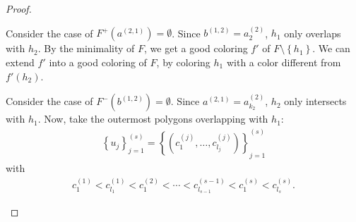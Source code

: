 \documentclass[12pt]{article}
\theoremstyle{definition}
\def\rxhalf{0.5/2}
\def\ryhalf{0.4/2}
\def\rxfourpoint{4.5/2}
\def\ryfourpoint{2.3/2}
\def\rxfivepoint{5.5/2}
\def\ryfivepoint{3.0/2}
\begin{document}
\begin{proof}
\begin{itemize}
\begin{figure}[ht]
\begin{center}
{
             }
             \end{center}
             \caption{}
             \label{figure:t=2}
             \end{figure}
             
             Consider the case of
             $F^{+}\left(a^{\left(2, 1\right)}\right) = \emptyset$.
             Since $b^{\left(1, 2\right)} =
             a_{2}^{\left(2\right)}$, $h_1$ only
             overlaps with $h_2$.
             By the minimality of $F$, 
             we get a good coloring 
             $f'$ of $F \setminus \left\{h_1\right\}$.
             We can extend $f'$ into 
             a good coloring of $F$,
             by coloring $h_1$ with 
             a color different from
             $f'\left(h_2\right)$.

             Consider the case of
             $F^{-}\left(b^{\left(1, 2\right)}\right) = \emptyset$.
             Since $a^{\left(2, 1\right)} = 
             a_{k_2}^{\left(2\right)}$,
             $h_2$ only intersects with $h_1$.
             Now, take the outermost polygons
             overlapping with $h_1$:
             \begin{gather*}
                 \left\{u_{j}\right\}_{j = 1}^{\left(s\right)} = 
                 \left\{\left(c_1^{\left(j\right)}, \ldots,
                 c_{l_{j}}^{\left(j\right)}\right)\right\}_{j = 1}^{\left(s\right)}
             \end{gather*}
             with
             \begin{gather*}
                 c_1^{\left(1\right)} <
                 c_{l_1}^{\left(1\right)} <
                 c_1^{\left(2\right)} < 
                 \cdots <
                 c_{l_{s-1}}^{\left(s- 1\right)} <
                 c_1^{\left(s\right)} <
                 c_{l_{s}}^{\left(s\right)}.
             \end{gather*}


\end{itemize}
\end{proof}
\end{document}
